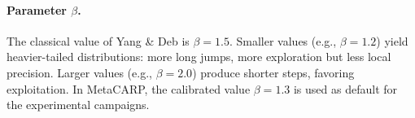 \documentclass[12pt, a4paper]{article}
\begin{document}
\paragraph{Parameter $\beta$.}
The classical value of Yang \& Deb is $\beta = 1.5$. Smaller values (e.g.,
$\beta = 1.2$) yield heavier-tailed distributions: more long jumps, more
exploration but less local precision. Larger values (e.g., $\beta = 2.0$)
produce shorter steps, favoring exploitation. In MetaCARP, the calibrated value
$\beta = 1.3$ is used as default for the experimental campaigns.
\end{document}
